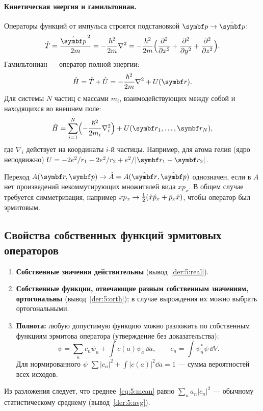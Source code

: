 \paragraph{Кинетическая энергия и гамильтониан.} Операторы функций от импульса строятся
подстановкой $\vect p\to\op{\vect p}$:
\begin{equation}\label{eq:5:T}
  \op T=\frac{\op{\vect p}^{\,2}}{2m}=-\frac{\hbar^2}{2m}\nabla^2=
  -\frac{\hbar^2}{2m}\Bigl(\pdiff{^2}{x^2}+\pdiff{^2}{y^2}+\pdiff{^2}{z^2}\Bigr).
\end{equation}
Гамильтониан — оператор полной энергии:
\begin{equation}\label{eq:5:H}
  \op H=\op T+\op U=-\frac{\hbar^2}{2m}\nabla^2+U(\vect r).
\end{equation}
Для системы $N$ частиц с массами $m_i$, взаимодействующих между собой и находящихся во внешнем поле:
\begin{equation}\label{eq:5:HN}
  \op H=\sum_{i=1}^{N}\Bigl(-\frac{\hbar^2}{2m_i}\nabla_i^2\Bigr)+U(\vect r_1,\dots,\vect r_N),
\end{equation}
где $\nabla_i$ действует на координаты $i$-й частицы. Например, для атома гелия (ядро
неподвижно) $U=-2e^2/r_1-2e^2/r_2+e^2/|\vect r_1-\vect r_2|$.

\begin{remark}
Переход $A(\vect r,\vect p)\to\op A=A(\op{\vect r},\op{\vect p})$ однозначен, если в $A$ нет произведений
некоммутирующих множителей вида $xp_x$. В общем случае требуется симметризация, например
$xp_x\to\frac12(\hat{x}\hat{p}_x+\hat{p}_x\hat{x})$, чтобы оператор был эрмитовым.
\end{remark}

\subsection{Свойства собственных функций эрмитовых операторов}

\begin{enumerate}
 \item \textbf{Собственные значения действительны} (вывод~\ref{der:5:real}).
 \item \textbf{Собственные функции, отвечающие разным собственным значениям, ортогональны}
       (вывод~\ref{der:5:orth}); в случае вырождения их можно выбрать ортогональными.
 \item \textbf{Полнота:} любую допустимую функцию можно разложить по собственным функциям
       эрмитова оператора (утверждение без доказательства):
       \begin{equation}\label{eq:5:expand}
         \psi=\sum_nc_n\psi_n+\int c(a)\psi_a\,\dd a,\qquad c_n=\int\psi_n^*\psi\,\dd V .
       \end{equation}
       Для нормированного $\psi$ $\sum|c_n|^2+\int|c(a)|^2\dd a=1$ — сумма вероятностей всех исходов.
\end{enumerate}
Из разложения следует, что среднее~\eqref{eq:5:mean} равно $\sum_na_n|c_n|^2$ — обычному
статистическому среднему (вывод~\ref{der:5:avg}).

